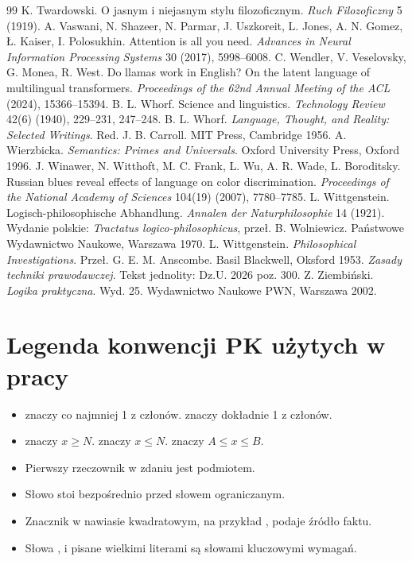 \documentclass[11pt,a4paper]{article}
\begin{document}
\begin{thebibliography}{99}
 K. Twardowski. O jasnym i niejasnym stylu filozoficznym. \emph{Ruch Filozoficzny} 5 (1919).
 A. Vaswani, N. Shazeer, N. Parmar, J. Uszkoreit, L. Jones, A. N. Gomez, Ł. Kaiser, I. Polosukhin. Attention is all you need. \emph{Advances in Neural Information Processing Systems} 30 (2017), 5998--6008.
 C. Wendler, V. Veselovsky, G. Monea, R. West. Do llamas work in English? On the latent language of multilingual transformers. \emph{Proceedings of the 62nd Annual Meeting of the ACL} (2024), 15366--15394.
 B. L. Whorf. Science and linguistics. \emph{Technology Review} 42(6) (1940), 229--231, 247--248.
 B. L. Whorf. \emph{Language, Thought, and Reality: Selected Writings}. Red. J. B. Carroll. MIT Press, Cambridge 1956.
 A. Wierzbicka. \emph{Semantics: Primes and Universals}. Oxford University Press, Oxford 1996.
 J. Winawer, N. Witthoft, M. C. Frank, L. Wu, A. R. Wade, L. Boroditsky. Russian blues reveal effects of language on color discrimination. \emph{Proceedings of the National Academy of Sciences} 104(19) (2007), 7780--7785.
 L. Wittgenstein. Logisch-philosophische Abhandlung. \emph{Annalen der Naturphilosophie} 14 (1921). Wydanie polskie: \emph{Tractatus logico-philosophicus}, przeł. B. Wolniewicz. Państwowe Wydawnictwo Naukowe, Warszawa 1970.
 L. Wittgenstein. \emph{Philosophical Investigations}. Przeł. G. E. M. Anscombe. Basil Blackwell, Oksford 1953.
 \emph{Zasady techniki prawodawczej}. Tekst jednolity: Dz.U. 2026 poz. 300.
 Z. Ziembiński. \emph{Logika praktyczna}. Wyd. 25. Wydawnictwo Naukowe PWN, Warszawa 2002.
\end{thebibliography}

\appendix

\section{Legenda konwencji PK użytych w pracy}
\label{app:legend}

\begin{itemize}[leftmargin=1.6em,itemsep=1pt]
  \item {} znaczy co najmniej 1 z członów.  znaczy dokładnie 1 z członów.
  \item {} znaczy $x\ge N$.  znaczy $x\le N$.
   znaczy $A\le x\le B$.
  \item Pierwszy rzeczownik w zdaniu jest podmiotem.
  \item Słowo  stoi bezpośrednio przed słowem ograniczanym.
  \item Znacznik w nawiasie kwadratowym, na przykład \pkq{[założenie]}, podaje źródło faktu.
  \item Słowa ,  i  pisane wielkimi literami są
  słowami kluczowymi wymagań.
\end{itemize}
\end{document}
